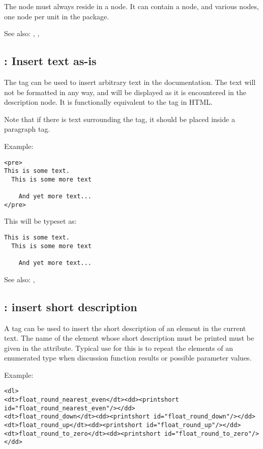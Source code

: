 The  node must always reside in a  node.
It can contain a  node, and various  nodes, one node
per unit in the package.

See also: , , 

\subsection{ : Insert text as-is}
\label{tag:pre}
The  tag can be used to insert arbitrary text in the documentation.
The text will not be formatted in any way, and will be displayed as it is
encountered in the description node. It is functionally equivalent to the
 tag in HTML.

Note that if there is text surrounding the  tag, it should be placed
inside a  paragraph tag.

Example:
\begin{verbatim}
<pre>
This is some text.
  This is some more text

    And yet more text...
</pre>
\end{verbatim}
This will be typeset as:
\begin{verbatim}
This is some text.
  This is some more text

    And yet more text...
\end{verbatim}

See also: , 

\subsection{ : insert short description}
\label{tag:printshort}
A  tag can be used to insert the short description of an 
element in the current text. The name of the element whose short description
must be printed must be given in the  attribute. Typical use for
this is to repeat the elements of an enumerated type when discussion
function results or possible parameter values.

Example:
\begin{verbatim}
<dl>
<dt>float_round_nearest_even</dt><dd><printshort id="float_round_nearest_even"/></dd>
<dt>float_round_down</dt><dd><printshort id="float_round_down"/></dd>
<dt>float_round_up</dt><dd><printshort id="float_round_up"/></dd>
<dt>float_round_to_zero</dt><dd><printshort id="float_round_to_zero"/></dd>
\end{verbatim}

